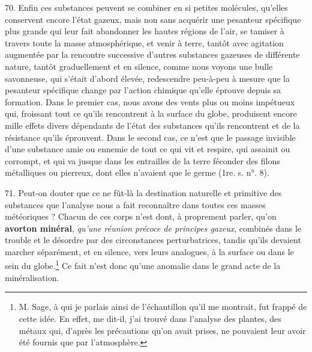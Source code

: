 \documentclass[a4paper, 11pt, oneside, polutonikogreek, french]{article}
\begin{document}
70. Enfin ces substances peuvent se combiner en si petites molécules, qu'elles conservent encore l'état gazeux, mais non sans acquérir une pesanteur spécifique plus grande qui leur fait abandonner les hautes régions de l'air, se tamiser à travers toute la masse atmosphérique, et venir à terre, tantôt avec agitation augmentée par la rencontre successive d'autres substances gazeuses de différente nature, tantôt graduellement et en silence, comme nous voyons une bulle savonneuse, qui s'était d'abord élevée, redescendre peu-à-peu à mesure que la pesanteur spécifique change par l'action chimique qu'elle éprouve depuis sa formation. Dans le premier cas, nous avons des vents plus ou moins impétueux qui, froissant tout ce qu'ils rencontrent à la surface du globe, produisent encore mille effets divers dépendants de l'état des substances qu'ils rencontrent et de la résistance qu'ils éprouvent. Dans le second cas, ce n'est que le passage invisible d'une substance amie ou ennemie de tout ce qui vit et respire, qui assainit ou corrompt, et qui va jusque dans les entrailles de la terre féconder des filons métalliques ou pierreux, dont elles n'avaient que le germe (1re. s. n°. 8).

71. Peut-on douter que ce ne fût-là la destination naturelle et primitive des substances que l'analyse nous a fait reconnaître dans toutes ces masses météoriques ? Chacun de ces corps n'est dont, à proprement parler, qu'on \textbf{avorton minéral}, \emph{qu'une réunion précoce de principes gazeux}, combinés dans le trouble et le désordre par des circonstances perturbatrices, tandis qu'ils devaient marcher séparément, et en silence, vers leurs analogues, à la surface ou dans le sein du globe.\footnote{M. Sage, à qui je parlais ainsi de l'échantillon qu'il me montrait, fut frappé de cette idée. \og En effet, me dit-il, j'ai trouvé dans l'analyse des plantes, des métaux qui, d'après les précautions qu'on avait prises, ne pouvaient leur avoir été fournis que par l'atmosphère. \fg} Ce fait n'est donc qu'une anomalie dans le grand acte de la minéralisation.
\end{document}
